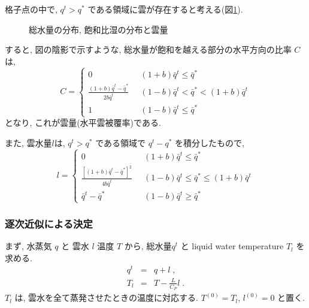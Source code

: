 格子点の中で,
$q^t > q^*$ である領域に雲が存在すると考える(図\ref{lsc:fig-cloud}).

\begin{figure}[hbtp]
  \begin{center}
  \end{center}
  \caption{総水量の分布, 飽和比湿の分布と雲量}
  \label{lsc:fig-cloud}
\end{figure}


すると, 図の陰影で示すような,
総水量が飽和を越える部分の水平方向の比率 $C$ は,
\begin{equation}
  C = \left\{ 
           \begin{array}{ll}
             0 \; \; & (1+b)\bar{q}^t \leq \bar{q}^* \\
             \displaystyle
             \frac{(1+b)\bar{q}^t - \bar{q}^*}
                  {2b\bar{q}^t}                    
               \; \; & (1-b)\bar{q}^t < \bar{q}^* < (1+b)\bar{q}^t \\
             1 \; \; & (1-b)\bar{q}^t \leq \bar{q}^*
           \end{array}
        \right.
\end{equation}
となり, これが雲量(水平雲被覆率)である.

また, 雲水量$l$は, $q^t > q^*$ である領域で
$q^t - q^*$ を積分したもので,
\begin{equation}
  l = \left\{ 
           \begin{array}{ll} \displaystyle
             0 \; \; & (1+b)\bar{q}^t \leq \bar{q}^* \\
            \displaystyle
             \frac{\left[(1+b)\bar{q}^t - \bar{q}^*\right]^2}
                  {4b\bar{q}^t}
               \; \; & (1-b)\bar{q}^t \leq \bar{q}^* \leq (1+b)\bar{q}^t  \\
            \displaystyle
             \bar{q}^t - \bar{q}^*
                \; \; & (1-b)\bar{q}^t \geq \bar{q}^*
           \end{array}
        \right. 
  \label{p-lsc:l}
\end{equation}

\subsubsection{逐次近似による決定}

まず, 水蒸気 $q$ と 雲水 $l$ 温度 $T$ から,
総水量$q^t$ と liquid water temperature $T_l$ を求める.
\begin{eqnarray}
  q^t  & = & q + l \; , \\
  T_l  & = & T - \frac{L}{C_P} l \; .
\end{eqnarray}
$T_l$ は, 雲水を全て蒸発させたときの温度に対応する.
$T^{(0)} = T_l$, $l^{(0)} = 0$ と置く.

